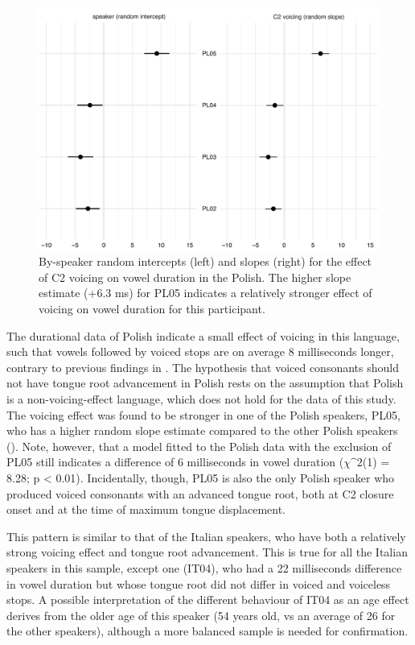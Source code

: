 \documentclass[authoryear, twocolumn]{elsarticle}
\begin{document}
\begin{figure}
    \centering
    \includegraphics[height=.35\textwidth]{fig/polish-re.pdf}
    \caption{By-speaker random intercepts (left) and slopes (right) for the effect of C2 voicing on vowel duration in the Polish. The higher slope estimate (+6.3 ms) for PL05 indicates a relatively stronger effect of voicing on vowel duration for this participant.}
    \label{f:polish-re}
\end{figure}

The durational data of Polish indicate a small effect of voicing in this
language, such that vowels followed by voiced stops are on average 8
milliseconds longer, contrary to previous findings in
\citet{keating1984}. The hypothesis that voiced consonants should not
have tongue root advancement in Polish rests on the assumption that
Polish is a non-voicing-effect language, which does not hold for the
data of this study. The voicing effect was found to be stronger in one
of the Polish speakers, PL05, who has a higher random slope estimate
compared to the other Polish speakers (). Note,
however, that a model fitted to the Polish data with the exclusion of
PL05 still indicates a difference of 6 milliseconds in vowel duration
(\(\chi\^2\)(1) = 8.28; p \textless{} 0.01). Incidentally, though, PL05
is also the only Polish speaker who produced voiced consonants with an
advanced tongue root, both at C2 closure onset and at the time of
maximum tongue displacement.

This pattern is similar to that of the Italian speakers, who have both a
relatively strong voicing effect and tongue root advancement. This is
true for all the Italian speakers in this sample, except one (IT04), who
had a 22 milliseconds difference in vowel duration but whose tongue root
did not differ in voiced and voiceless stops. A possible interpretation
of the different behaviour of IT04 as an age effect derives from the
older age of this speaker (54 years old, vs an average of 26 for the
other speakers), although a more balanced sample is needed for
confirmation.
\end{document}
